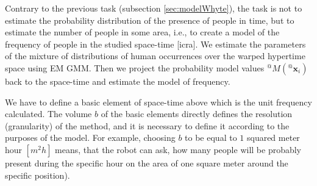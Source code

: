 %


Contrary to the previous task (subsection \ref{sec:modelWhyte}), the task is not to estimate the probability distribution of the presence of people in time, but to estimate the number of people in some area, i.e., to create a model of the frequency of people in the studied space-time [icra].
We estimate the parameters of the mixture of distributions of human occurrences over the warped hypertime space using EM GMM.
Then we project the probability model values ${}^{@}M({}^{@}\mathbf{x}_{i})$ back to the space-time and estimate the model of frequency.

We have to define a basic element of space-time above which is the unit frequency calculated. 
The volume $b$ of the basic elements directly defines the resolution (granularity) of the method, and it is necessary to define it according to the purposes of the model.
For example, choosing $b$ to be equal to $1$ squared meter hour $[m^{2}h]$ means, that the robot can ask, how many people will be probably present during the specific hour on the area of one square meter around the specific position). 

